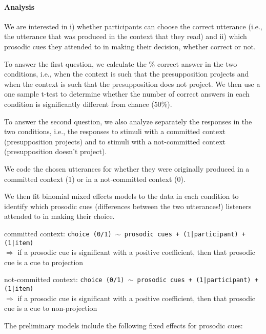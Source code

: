 \documentclass[dina4,12pt,fleqn]{article}
\newcommand{\6}{\mbox{$[\hspace*{-.6mm}[$}}
\newcommand{\9}{\mbox{$]\hspace*{-.6mm}]$}}
\begin{document}
\paragraph{Analysis} We are interested in i) whether participants can choose the correct utterance (i.e., the utterance that was produced in the context that they read) and ii) which prosodic cues they attended to in making their decision, whether correct or not. 

To answer the first question, we calculate the \% correct answer in the two conditions, i.e., when the context is such that the presupposition projects and when the context is such that the presupposition does not project. We then use a one sample t-test to determine whether the number of correct answers in each condition is significantly different from chance (50\%).

To answer the second question, we also analyze separately the responses in the two conditions, i.e., the responses to stimuli with a committed context (presupposition projects) and to stimuli with a not-committed context (presupposition doesn't project).

We code the chosen utterances for whether they were originally produced in a committed context (1) or in a not-committed context (0). 

We then fit binomial mixed effects models to the data in each condition to identify which prosodic cues (differences between the two utterances!) listeners attended to in making their choice.

committed context: {\tt choice (0/1) $\sim$ prosodic cues + (1|participant)  + (1|item) }
\\ $\Longrightarrow$ if a prosodic cue is significant with a positive coefficient, then that prosodic cue is a cue to projection

not-committed context: {\tt choice (0/1) $\sim$ prosodic cues + (1|participant)  + (1|item) }
\\ $\Longrightarrow$ if a prosodic cue is significant with a positive coefficient, then that prosodic cue is a cue to non-projection

\medskip

The preliminary models include the following fixed effects for prosodic cues:
\end{document}
